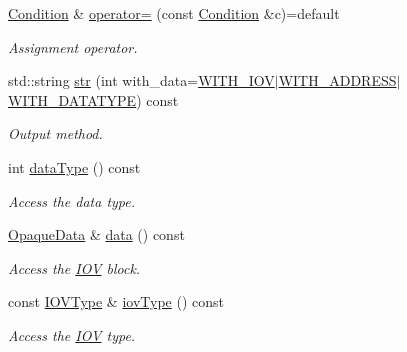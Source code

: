 \begin{DoxyCompactItemize}
\hyperlink{class_d_d4hep_1_1_conditions_1_1_condition}{Condition} \& \hyperlink{class_d_d4hep_1_1_conditions_1_1_condition_a2691d97a4770fc129beb2cf61628efa5}{operator=} (const \hyperlink{class_d_d4hep_1_1_conditions_1_1_condition}{Condition} \&c)=default
\begin{DoxyCompactList}\small\item\em Assignment operator. \end{DoxyCompactList}\item 
std\+::string \hyperlink{class_d_d4hep_1_1_conditions_1_1_condition_a52e16cc74af6243e39b6c55e6ae27c84}{str} (int with\+\_\+data=\hyperlink{class_d_d4hep_1_1_conditions_1_1_condition_a6d54644b9e4e9d550a10707e72e5b298a407e2b00d51258e13d82e8632f62746b}{W\+I\+T\+H\+\_\+\+I\+OV}$\vert$\hyperlink{class_d_d4hep_1_1_conditions_1_1_condition_a6d54644b9e4e9d550a10707e72e5b298a4a0769943c197cfba347ebc1397a2ee7}{W\+I\+T\+H\+\_\+\+A\+D\+D\+R\+E\+SS}$\vert$\hyperlink{class_d_d4hep_1_1_conditions_1_1_condition_a6d54644b9e4e9d550a10707e72e5b298a1f2afb3299a66acc0b45e2e098053253}{W\+I\+T\+H\+\_\+\+D\+A\+T\+A\+T\+Y\+PE}) const
\begin{DoxyCompactList}\small\item\em Output method. \end{DoxyCompactList}\item 
int \hyperlink{class_d_d4hep_1_1_conditions_1_1_condition_ac207d21e451115f030cd7de5c7db130b}{data\+Type} () const
\begin{DoxyCompactList}\small\item\em Access the data type. \end{DoxyCompactList}\item 
\hyperlink{class_d_d4hep_1_1_opaque_data}{Opaque\+Data} \& \hyperlink{class_d_d4hep_1_1_conditions_1_1_condition_aae50a2f98a0baabcfaab2a8167a10b3e}{data} () const
\begin{DoxyCompactList}\small\item\em Access the \hyperlink{class_d_d4hep_1_1_i_o_v}{I\+OV} block. \end{DoxyCompactList}\item 
const \hyperlink{class_d_d4hep_1_1_i_o_v_type}{I\+O\+V\+Type} \& \hyperlink{class_d_d4hep_1_1_conditions_1_1_condition_a12dfb75986761c94ca5053dc09140ee2}{iov\+Type} () const
\begin{DoxyCompactList}\small\item\em Access the \hyperlink{class_d_d4hep_1_1_i_o_v}{I\+OV} type. \end{DoxyCompactList}\item 

\end{DoxyCompactItemize}

